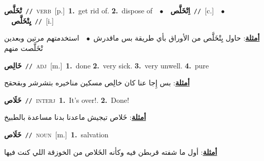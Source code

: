 \documentclass[10pt,a4paper,twoside]{article} %
\begin{document}
\begin{multicols}{2}
{\setlength\topsep{0pt}\textbf{\foreignlanguage{arabic}{تْخَلَّص}}\ {\color{gray}\texttt{//}\color{black}}\ \textsc{verb}\ [p.]\ \textbf{1.}~get rid of.  \textbf{2.}~dispose of\ \ $\bullet$\ \ \setlength\topsep{0pt}\textbf{\foreignlanguage{arabic}{اِتْخَلَّص}}\ {\color{gray}\texttt{//}\color{black}}\ [c.]\ \ $\bullet$\ \ \setlength\topsep{0pt}\textbf{\foreignlanguage{arabic}{يِتْخَلَّص}}\ {\color{gray}\texttt{//}\color{black}}\ [i.]\  \begin{flushright}\color{gray}\foreignlanguage{arabic}{\textbf{\underline{\foreignlanguage{arabic}{أمثلة}}}: حاول يِتْخَلَّص من الأوراق بأي طريقة بس ماقدرش\ $\bullet$\ \  استخدمتهم مرتين وبعدين تْخَلَّصت منهم}\end{flushright}\color{black}} \vspace{2mm}

{\setlength\topsep{0pt}\textbf{\foreignlanguage{arabic}{خَالِص}}\ {\color{gray}\texttt{//}\color{black}}\ \textsc{adj}\ [m.]\ \textbf{1.}~done  \textbf{2.}~very sick.  \textbf{3.}~very unwell.  \textbf{4.}~pure\  \begin{flushright}\color{gray}\foreignlanguage{arabic}{\textbf{\underline{\foreignlanguage{arabic}{أمثلة}}}: بس إِجا عنا كان خالِص مسكين مناخيره بتشرشر وبقحقح}\end{flushright}\color{black}} \vspace{2mm}

{\setlength\topsep{0pt}\textbf{\foreignlanguage{arabic}{خَلَاص}}\ {\color{gray}\texttt{//}\color{black}}\ \textsc{interj}\ \textbf{1.}~It's over!.  \textbf{2.}~Done!\  \begin{flushright}\color{gray}\foreignlanguage{arabic}{\textbf{\underline{\foreignlanguage{arabic}{أمثلة}}}: خَلاص تيجيش ماعدنا بدنا مساعدة بالطبيخ}\end{flushright}\color{black}} \vspace{2mm}

{\setlength\topsep{0pt}\textbf{\foreignlanguage{arabic}{خَلَاص}}\ {\color{gray}\texttt{//}\color{black}}\ \textsc{noun}\ [m.]\ \textbf{1.}~salvation\  \begin{flushright}\color{gray}\foreignlanguage{arabic}{\textbf{\underline{\foreignlanguage{arabic}{أمثلة}}}: أول ما شفته قربطن فيه وكأنه الخَلاص من الخوزقة اللي كنت فيها}\end{flushright}\color{black}} \vspace{2mm}


\end{multicols}
\end{document}
